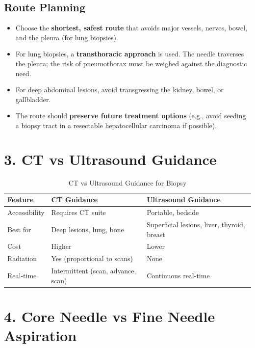 \subsection{Route Planning}
\begin{itemize}
  \item Choose the \textbf{shortest, safest route} that avoids major vessels, nerves, bowel, and the pleura (for lung biopsies).
  \item For lung biopsies, a \textbf{transthoracic approach} is used. The needle traverses the pleura; the risk of pneumothorax must be weighed against the diagnostic need.
  \item For deep abdominal lesions, avoid transgressing the kidney, bowel, or gallbladder.
  \item The route should \textbf{preserve future treatment options} (e.g., avoid seeding a biopsy tract in a resectable hepatocellular carcinoma if possible).
\end{itemize}

\section{3. CT vs Ultrasound Guidance}

\begin{table}[h]
\centering
\begin{tabular}{@{}p{}p{}p{}@{}}
\hline
\textbf{Feature} & \textbf{CT Guidance} & \textbf{Ultrasound Guidance} \\
\hline
Accessibility & Requires CT suite & Portable, bedside \\
Best for & Deep lesions, lung, bone & Superficial lesions, liver, thyroid, breast \\
Cost & Higher & Lower \\
Radiation & Yes (proportional to scans) & None \\
Real-time & Intermittent (scan, advance, scan) & Continuous real-time \\
\hline
\end{tabular}
\caption{CT vs Ultrasound Guidance for Biopsy}
\end{table}

\section{4. Core Needle vs Fine Needle Aspiration}

